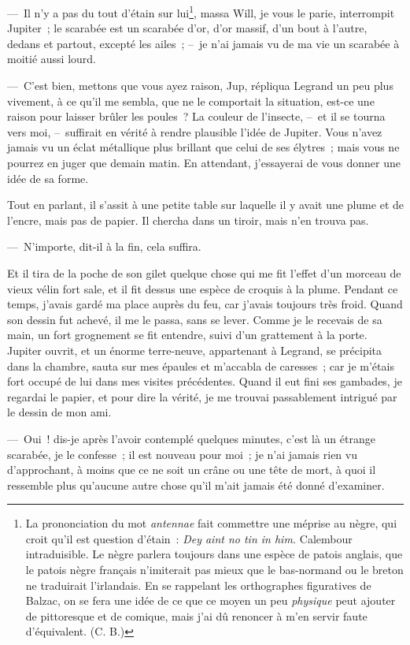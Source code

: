 \documentclass[french,twoside]{book} %
\begin{document}
— Il n’y a pas du tout d’étain sur lui\footnote{La prononciation du mot \emph{antennae} fait commettre une méprise au nègre, qui croit qu’il est question d’étain : \emph{Dey aint no tin in him.} Calembour intraduisible. Le nègre parlera toujours dans une espèce de patois anglais, que le patois nègre français n’imiterait pas mieux que le bas-normand ou le breton ne traduirait l’irlandais. En se rappelant les orthographes figuratives de Balzac, on se fera une idée de ce que ce moyen un peu \emph{physique} peut ajouter de pittoresque et de comique, mais j’ai dû renoncer à m’en servir faute d’équivalent. (C. B.)}, massa Will, je vous le parie, interrompit Jupiter ; le scarabée est un scarabée d’or, d’or massif, d’un bout à l’autre, dedans et partout, excepté les ailes ; – je n’ai jamais vu de ma vie un scarabée à moitié aussi lourd.\par
— C’est bien, mettons que vous ayez raison, Jup, répliqua Legrand un peu plus vivement, à ce qu’il me sembla, que ne le comportait la situation, est-ce une raison pour laisser brûler les poules ? La couleur de l’insecte, – et il se tourna vers moi, – suffirait en vérité à rendre plausible l’idée de Jupiter. Vous n’avez jamais vu un éclat métallique plus brillant que celui de ses élytres ; mais vous ne pourrez en juger que demain matin. En attendant, j’essayerai de vous donner une idée de sa forme.\par
Tout en parlant, il s’assit à une petite table sur laquelle il y avait une plume et de l’encre, mais pas de papier. Il chercha dans un tiroir, mais n’en trouva pas.\par
— N’importe, dit-il à la fin, cela suffira.\par
Et il tira de la poche de son gilet quelque chose qui me fit l’effet d’un morceau de vieux vélin fort sale, et il fit dessus une espèce de croquis à la plume. Pendant ce temps, j’avais gardé ma place auprès du feu, car j’avais toujours très froid. Quand son dessin fut achevé, il me le passa, sans se lever. Comme je le recevais de sa main, un fort grognement se fit entendre, suivi d’un grattement à la porte. Jupiter ouvrit, et un énorme terre-neuve, appartenant à Legrand, se précipita dans la chambre, sauta sur mes épaules et m’accabla de caresses ; car je m’étais fort occupé de lui dans mes visites précédentes. Quand il eut fini ses gambades, je regardai le papier, et pour dire la vérité, je me trouvai passablement intrigué par le dessin de mon ami.\par
— Oui ! dis-je après l’avoir contemplé quelques minutes, c’est là un étrange scarabée, je le confesse ; il est nouveau pour moi ; je n’ai jamais rien vu d’approchant, à moins que ce ne soit un crâne ou une tête de mort, à quoi il ressemble plus qu’aucune autre chose qu’il m’ait jamais été donné d’examiner.\par
\end{document}
